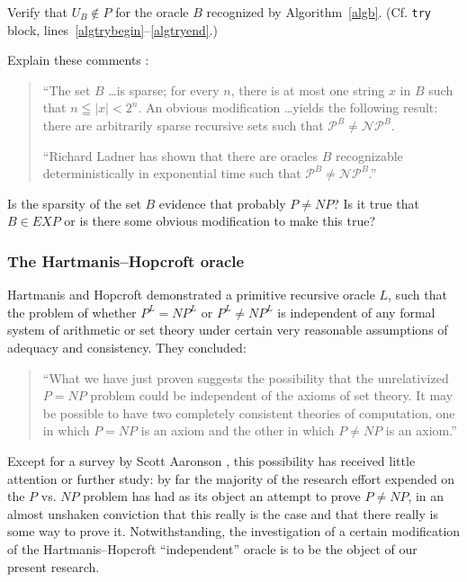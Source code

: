 \documentclass[letterpaper]{article}
\begin{document}
\begin{exercise}Verify that $U_B\notin P$ for the oracle $B$ recognized by Algorithm~\ref{algb}.  (Cf. \cite{cpptry} \texttt{try} block, lines~\ref{algtrybegin}--\ref{algtryend}.)
\end{exercise}

\begin{exercise}
Explain these comments \cite[p.~436]{baker1975relativizations}:
\begin{quotation}
	``The set $B$ \dots is sparse; for every $n$, there is at most one string $x$ in $B$ such that $n\leqq|x|<2^n$.  An obvious modification \dots yields the following result: there are arbitrarily sparse recursive sets such that $\mathscr{P}^B\ne\mathscr{NP}^B$.
	
	``Richard Ladner has shown that there are oracles $B$ recognizable deterministically in exponential time such that $\mathscr{P}^B\ne\mathscr{NP}^B$.''
\end{quotation}
Is the sparsity of the set $B$ evidence that probably $P\ne NP$?  Is it true that $B\in EXP$ or is there some obvious modification to make this true?
\end{exercise}
\subsubsection{The Hartmanis--Hopcroft oracle}
Hartmanis and Hopcroft \cite{hartmanis1976independence} \cite[\S 2, pp.~5--7]{tr-76-296} demonstrated a primitive recursive oracle $L$, such that the problem of whether $P^L=NP^L$ or $P^L\ne NP^L$ is independent of any formal system of arithmetic or set theory under certain very reasonable assumptions of adequacy and consistency.  They concluded:
\begin{quote}
	``What we have just proven suggests the possibility that the unrelativized $P=NP$ problem could be independent of the axioms of set theory.  It may be possible to have two completely consistent theories of computation, one in which $P=NP$ is an axiom and the other in which $P\ne NP$ is an axiom.''
\end{quote}
Except for a survey by Scott Aaronson \cite{aaronsonp}, this possibility has received little attention or further study:  by far the majority of the research effort expended on the $P$ vs. $NP$ problem has had as its object an attempt to prove $P\ne NP$, in an almost unshaken conviction that this really is the case and that there really is some way to prove it.  Notwithstanding, the investigation of a certain modification of the Hartmanis--Hopcroft ``independent'' oracle is to be the object of our present research.
\end{document}
